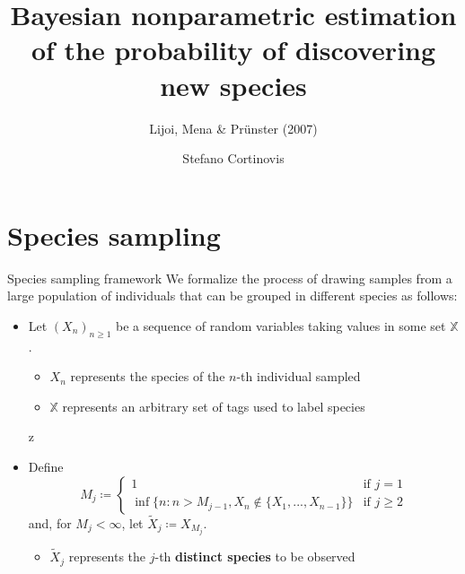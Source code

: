 \documentclass[11pt, handout]{beamer}
\title[Lijoi et al. (2007)]{Bayesian nonparametric estimation of the probability of discovering new species}
\subtitle{Lijoi, Mena \& Pr{\"u}nster (2007)}
\author{Stefano Cortinovis}
\date[20605 - Machine Learning II]{\displaydate{date}}
\begin{document}
\nocite{*}

\begin{frame}
\titlepage
\end{frame}

\section{Species sampling}

\begin{frame}[t]{Species sampling framework}
We formalize the process of drawing samples from a large population of individuals that can be grouped in different species as follows:
\begin{itemize}
    \item Let \((X_n)_{n \geq 1}\) be a sequence of random variables taking values in some set \(\mathbb{X}\).
    \begin{itemize}
        \item \(X_n\) represents the species of the \(n\)-th individual sampled
        \item \(\mathbb{X}\) represents an arbitrary set of tags used to label species
    \end{itemize}z
    \item Define
    \begin{equation*}
        M_j \coloneqq 
        \begin{cases}
            1 & \text{if } j = 1\\
            \inf\{n \colon n > M_{j-1}, X_n \notin \{X_1,...,X_{n-1}\}\} & \text{if } j \geq 2
        \end{cases}
    \end{equation*}
    and, for \(M_j < \infty\), let \(\tilde{X}_j \coloneqq X_{M_j}\).
    \begin{itemize}
        \item \(\tilde{X}_j\) represents the \(j\)-th \textbf{distinct species} to be observed
    \end{itemize}
\end{itemize}
\end{frame}
\end{document}
